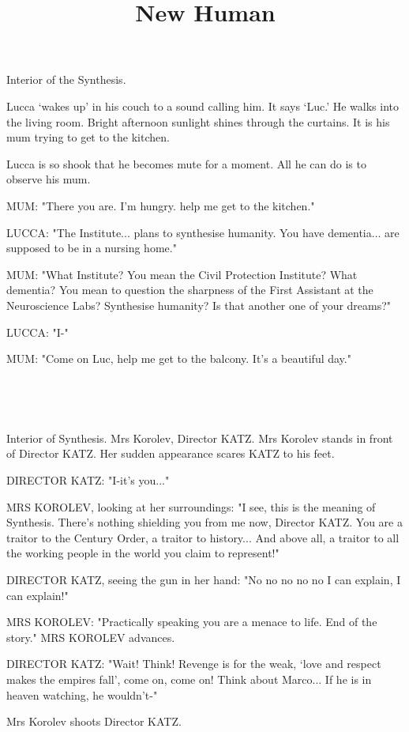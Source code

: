 \documentclass[11pt]{article}
\begin{document}
\ttfamily
\title{New Human}
\maketitle

Interior of the Synthesis.


Lucca `wakes up' in his couch to a sound calling him. 
It says `Luc.'
He walks into the living room. 
Bright afternoon sunlight shines through the curtains.
It is his mum trying to get to the kitchen.

Lucca is so shook that he becomes mute for a moment.
All he can do is to observe his mum.

MUM: "There you are.
I'm hungry.
help me get to the kitchen."

LUCCA: "The Institute... plans to synthesise humanity.
You have dementia... are supposed to be in a nursing home."

MUM: "What Institute? You mean the Civil Protection Institute? What dementia?
You mean to question the sharpness of the First Assistant at the Neuroscience Labs?
Synthesise humanity?
Is that another one of your dreams?"

LUCCA: "I-"

MUM: "Come on Luc, help me get to the balcony. It's a beautiful day."

\ 

\ 

Interior of Synthesis.
Mrs Korolev, Director KATZ.
Mrs Korolev stands in front of Director KATZ. 
Her sudden appearance scares KATZ to his feet.

DIRECTOR KATZ: "I-it's you..."

MRS KOROLEV, looking at her surroundings: "I see, this is the meaning of Synthesis.
There's nothing shielding you from me now, Director KATZ.
You are a traitor to the Century Order, a traitor to history...
And above all, a traitor to all the working people in the world you claim to represent!"

DIRECTOR KATZ, seeing the gun in her hand: "No no no no no I can explain, I can explain!"

MRS KOROLEV: "Practically speaking you are a menace to life. 
End of the story."
MRS KOROLEV advances.

DIRECTOR KATZ: "Wait! Think!
Revenge is for the weak, `love and respect makes the empires fall', come on, come on! 
Think about Marco...
If he is in heaven watching, he wouldn't-"

Mrs Korolev shoots Director KATZ.
\end{document}
